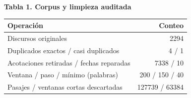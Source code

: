 \par\medskip\noindent\begin{minipage}{\linewidth}
\textbf{Tabla 1. Corpus y limpieza auditada}\par\smallskip
\begin{tabularx}{\linewidth}{@{}Yr@{}}\toprule
Operación & Conteo \\ \midrule
Discursos originales & 2294 \\
Duplicados exactos /\allowbreak{} casi duplicados & 4 /\allowbreak{} 1 \\
Acotaciones retiradas /\allowbreak{} fechas reparadas & 7338 /\allowbreak{} 10 \\
Ventana /\allowbreak{} paso /\allowbreak{} mínimo (palabras) & 200 /\allowbreak{} 150 /\allowbreak{} 40 \\
Pasajes /\allowbreak{} ventanas cortas descartadas & 127739 /\allowbreak{} 63384 \\
\bottomrule\end{tabularx}\end{minipage}\par\medskip
